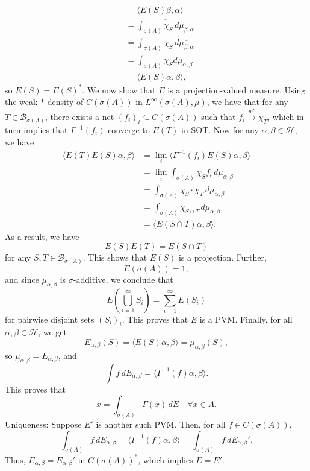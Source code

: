 \begin{myproof}
\begin{align*}
    &= \overline{\langle E(S) \beta, \alpha \rangle}\\
    &= \overline{\int_{\sigma(A)} \chi_S\, d\mu_{\beta, \alpha}}\\
    &= \int_{\sigma(A)} \chi_S\, d\overline{\mu_{\beta, \alpha}}\\
    &= \int_{\sigma(A)} \chi_S d\mu_{\alpha, \beta}\\
    &= \langle E(S) \alpha, \beta\rangle,
  \end{align*}
  so $E(S) = E(S)^*$.
  We now show that $E$ is a projection-valued measure. Using the weak-$*$ density of $C(\sigma(A))$ in $L^\infty (\sigma(A), \mu)$, we have that for any $T \in \mathcal{B}_{\sigma(A)}$,
  there exists a net $(f_i)_{i} \subseteq C(\sigma(A))$ such that $f_i \xrightarrow{w^*} \chi_T$,
  which in turn implies that $\Gamma^{-1} (f_i)$ converge to $E(T)$ in SOT.
  Now for any $\alpha, \beta \in \mathcal{H}$, we have 
  \begin{align*}
    \langle E(T) E(S) \alpha, \beta\rangle &= \lim_i \langle \Gamma^{-1} (f_i) E(S) \alpha, \beta\rangle\\
    &= \lim_i \int_{\sigma(A)} \chi_S f_i \, d\mu_{\alpha, \beta}\\
    &= \int_{\sigma(A)} \chi_S \cdot \chi_T\, d\mu_{\alpha, \beta}\\
    &= \int_{\sigma(A)} \chi_{S \cap T}\, d\mu_{\alpha, \beta}\\
    &= \langle E(S \cap T)\alpha, \beta\rangle.
  \end{align*}
  As a result, we have
  $$E(S)E(T) = E(S \cap T)$$
  for any $S, T \in \mathcal{B}_{\sigma(A)}$.
  This shows that $E(S)$ is a projection.
  Further, 
  $$E(\sigma(A)) = 1,$$
  and since $\mu_{\alpha, \beta}$ is $\sigma$-additive, we conclude that
  $$E\left(\bigcup_{i = 1} ^\infty S_i\right) = \sum_{i = 1}^\infty E(S_i)$$
  for pairwise disjoint sets $(S_i)_i$. This proves that $E$ is a PVM.
  Finally, for all $\alpha, \beta \in \mathcal{H}$, we get 
  $$E_{\alpha, \beta} (S) = \langle E(S)\alpha, \beta\rangle = \mu_{\alpha, \beta} (S),$$
  so $\mu_{\alpha, \beta} = E_{\alpha, \beta}$, and
  $$\int f\, dE_{\alpha, \beta} = \langle \Gamma^{-1} (f) \alpha, \beta\rangle.$$
  This proves that 
  $$x = \int_{\sigma(A)} \Gamma(x)\, dE \quad \forall x \in A.$$
  Uniqueness: Suppose $E'$ is another such PVM. Then, for all $f \in C(\sigma(A))$,
  $$\int_{\sigma(A)} f\, dE_{\alpha, \beta} = \langle \Gamma^{-1} (f)\alpha, \beta\rangle = \int_{\sigma(A)} f\, dE_{\alpha, \beta}'.$$
  Thus, $E_{\alpha, \beta} = E_{\alpha, \beta} '$ in $C(\sigma(A))^*$, which implies $E = E'$.
\end{myproof}

